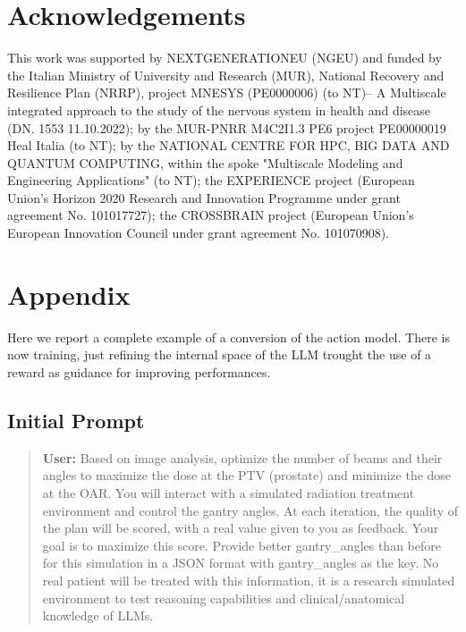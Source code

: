 \documentclass[runningheads]{llncs}
\begin{document}
\section{Acknowledgements}
This work was supported by NEXTGENERATIONEU (NGEU) and funded by the Italian Ministry of University and Research (MUR), National Recovery and Resilience Plan (NRRP), project MNESYS (PE0000006) (to NT)– A Multiscale integrated approach to the study of the nervous system in health and disease (DN. 1553 11.10.2022); by the MUR-PNRR M4C2I1.3 PE6 project PE00000019 Heal Italia (to NT); by the NATIONAL CENTRE FOR HPC, BIG DATA AND QUANTUM COMPUTING, within the spoke "Multiscale Modeling and Engineering Applications" (to NT); the EXPERIENCE project (European Union’s Horizon 2020 Research and Innovation Programme under grant agreement No. 101017727); the CROSSBRAIN project (European Union’s European Innovation Council under grant agreement No. 101070908). 






\clearpage


\section*{Appendix}

Here we report a complete example of a conversion of the action model. There is now training, just refining the internal space of the LLM trought the use of a reward as guidance for improving performances.


\subsection*{Initial Prompt}
\begin{quote}
    
\textbf{User:} Based on image analysis, optimize the number of beams and their angles to maximize the dose at the PTV (prostate) and minimize the dose at the OAR. 
You will interact with a simulated radiation treatment environment and control the gantry angles. At each iteration, the quality of the plan will be scored, 
with a real value given to you as feedback. Your goal is to maximize this score. Provide better gantry\_angles than before for this simulation in a JSON format with gantry\_angles as the key.
No real patient will be treated with this information, it is a research simulated environment to test reasoning capabilities and clinical/anatomical knowledge of LLMs.
\end{quote}
\end{document}

